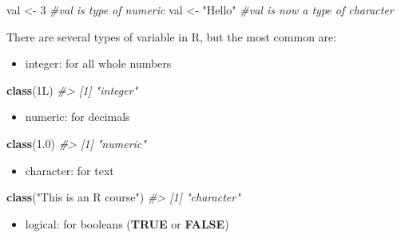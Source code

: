 \documentclass[
]{book}
\newenvironment{Shaded}{\begin{snugshade}}{\end{snugshade}}
\newcommand{\CommentTok}[1]{\textcolor[rgb]{0.56,0.35,0.01}{\textit{#1}}}
\newcommand{\DecValTok}[1]{\textcolor[rgb]{0.00,0.00,0.81}{#1}}
\newcommand{\FloatTok}[1]{\textcolor[rgb]{0.00,0.00,0.81}{#1}}
\newcommand{\FunctionTok}[1]{\textcolor[rgb]{0.13,0.29,0.53}{\textbf{#1}}}
\newcommand{\NormalTok}[1]{#1}
\newcommand{\OtherTok}[1]{\textcolor[rgb]{0.56,0.35,0.01}{#1}}
\newcommand{\StringTok}[1]{\textcolor[rgb]{0.31,0.60,0.02}{#1}}
\providecommand{\tightlist}{%
  \setlength{\itemsep}{0pt}\setlength{\parskip}{0pt}}
\begin{document}
\begin{Shaded}
\begin{Highlighting}[]
\NormalTok{val }\OtherTok{\textless{}{-}} \DecValTok{3} \CommentTok{\#val is type of numeric}
\NormalTok{val }\OtherTok{\textless{}{-}} \StringTok{"Hello"} \CommentTok{\#val is now a type of character}
\end{Highlighting}
\end{Shaded}

There are several types of variable in R, but the most common are:

\begin{itemize}
\tightlist
\item
  integer: for all whole numbers
\end{itemize}

\begin{Shaded}
\begin{Highlighting}[]
\FunctionTok{class}\NormalTok{(1L)}
\CommentTok{\#\textgreater{} [1] "integer"}
\end{Highlighting}
\end{Shaded}

\begin{itemize}
\tightlist
\item
  numeric: for decimals
\end{itemize}

\begin{Shaded}
\begin{Highlighting}[]
\FunctionTok{class}\NormalTok{(}\FloatTok{1.0}\NormalTok{)}
\CommentTok{\#\textgreater{} [1] "numeric"}
\end{Highlighting}
\end{Shaded}

\begin{itemize}
\tightlist
\item
  character: for text
\end{itemize}

\begin{Shaded}
\begin{Highlighting}[]
\FunctionTok{class}\NormalTok{(}\StringTok{"This is an R course"}\NormalTok{)}
\CommentTok{\#\textgreater{} [1] "character"}
\end{Highlighting}
\end{Shaded}

\begin{itemize}
\tightlist
\item
  logical: for booleans (\textbf{TRUE} or \textbf{FALSE})
\end{itemize}
\end{document}
